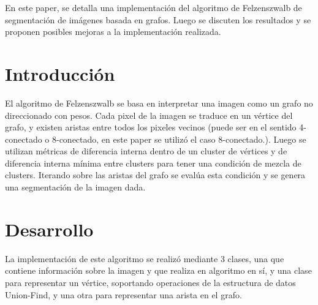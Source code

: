 \documentclass[letterpaper,11pt]{article} %
\begin{document}




\begin{resumen}
  En este paper, se detalla una implementación del algoritmo de Felzenszwalb de segmentación de imágenes basada en grafos. Luego se discuten los resultados y se proponen posibles mejoras a la implementación realizada.
\end{resumen}




\section{Introducción}
  El algoritmo de Felzenszwalb se basa en interpretar una imagen como un grafo no direccionado con pesos. Cada pixel de la imagen se traduce en un vértice del grafo, y existen aristas entre todos los pixeles vecinos (puede ser en el sentido 4-conectado o 8-conectado, en este paper se utilizó el caso 8-conectado.). Luego se utilizan métricas de diferencia interna dentro de un cluster de vértices y de diferencia interna mínima entre clusters para tener una condición de mezcla de clusters. Iterando sobre las aristas del grafo se evalúa esta condición y se genera una segmentación de la imagen dada.
  
\section{Desarrollo}
  La implementación de este algoritmo se realizó mediante 3 clases, una que contiene información sobre la imagen y que realiza en algoritmo en sí, y una clase para representar un vértice, soportando operaciones de la estructura de datos Union-Find, y una otra para representar una arista en el grafo.
\end{document}

